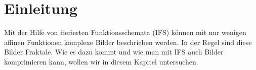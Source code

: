 %
%
%
\section{Einleitung \label{ifs:section:teil0}}
Mit der Hilfe von iterierten Funktionsschemata (IFS) können mit nur wenigen affinen Funktionen komplexe Bilder beschrieben werden.
%
%
%
In der Regel sind diese Bilder Fraktale.
%
Wie es dazu kommt und wie man mit IFS auch Bilder komprimieren kann, wollen wir in diesem Kapitel untersuchen.
%


